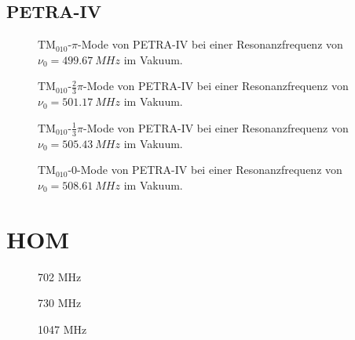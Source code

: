 \subsection{PETRA-IV}
\FloatBarrier
\begin{figure}[h]
  \centering
  
  \caption{$\mathrm{TM}_{010}\text{-}\pi$-Mode von PETRA-IV bei einer Resonanzfrequenz von $\nu_0 = \SI{499.67}{MHz}$ im Vakuum.}
\end{figure}

\begin{figure}[h]
  \centering
  
  \caption{$\mathrm{TM}_{010}\text{-}\frac{2}{3}\pi$-Mode von PETRA-IV bei einer Resonanzfrequenz von $\nu_0 = \SI{501.17}{MHz}$ im Vakuum.}
\end{figure}

\begin{figure}[h]
  \centering
  
  \caption{$\mathrm{TM}_{010}\text{-}\frac{1}{3}\pi$-Mode von PETRA-IV bei einer Resonanzfrequenz von $\nu_0 = \SI{505.43}{MHz}$ im Vakuum.}
\end{figure}

\begin{figure}[h]
  \centering
  
  \caption{$\mathrm{TM}_{010}\text{-}0$-Mode von PETRA-IV bei einer Resonanzfrequenz von $\nu_0 = \SI{508.61}{MHz}$ im Vakuum.}
\end{figure}
\FloatBarrier

\section{HOM}
\label{app:hom_felder}
\FloatBarrier

\begin{figure}[h]
  \centering
  
  \caption{702 MHz}
\end{figure}

\begin{figure}[h]
  \centering
  
  \caption{730 MHz}
\end{figure}

\begin{figure}[h]
  \centering
  
  \caption{1047 MHz}
\end{figure}

